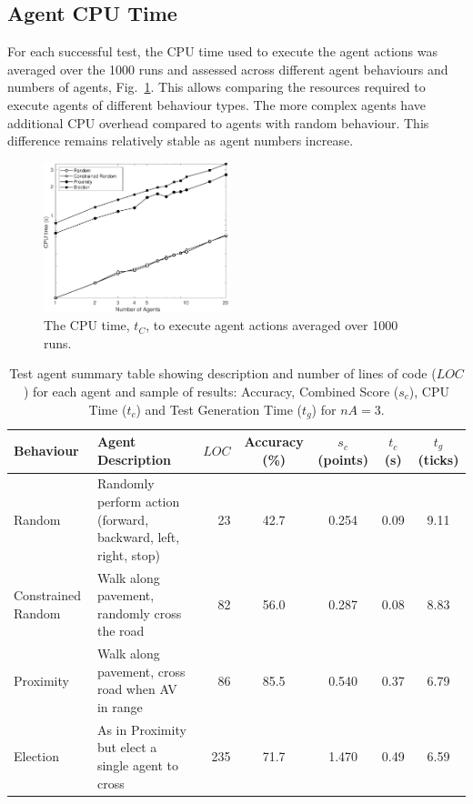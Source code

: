 \documentclass[letterpaper, 10 pt, journal, twoside]{IEEEtran}
\begin{document}
\subsection{Agent CPU Time}
For each successful test, the CPU time used to execute the agent actions was averaged over the 1000 runs and assessed across different agent behaviours and numbers of agents, Fig.~\ref{f:cputime}. This allows comparing the resources required to execute agents of different behaviour types. The more complex agents have additional CPU overhead compared to agents with random behaviour. This difference remains relatively stable as agent numbers increase.

\begin{figure}[!t]
	\centering
\includegraphics[width=0.48\textwidth]{TimeCPU.pdf}
	\caption{The CPU time, $t_{C}$, to execute agent actions averaged over 1000 runs.}
	\label{f:cputime}
\end{figure}



\begin{table}
\centering
\caption{Test agent summary table showing description and number of lines of code ($LOC$) for each agent and sample of results: Accuracy, Combined Score ($s_c$), CPU Time ($t_{c}$) and Test Generation Time ($t_{g}$) for $nA=3$.}
\label{t:ResultsTable}
\begin{tabular}{|l|p{7.1cm}|r||c|c|c|c|}
\hline
\textbf{Behaviour} & \textbf{Agent Description} & $LOC$ & Accuracy (\%) & $s_c$ (points)&  $t_{c}$ (s) & $t_{g}$ (ticks) \\
\hline
Random & Randomly perform action (forward, backward, left, right, stop) &  23& 42.7 & 0.254 & 0.09 & 9.11 \\
Constrained Random & Walk along pavement, randomly cross the road 		&  82& 56.0 & 0.287 & 0.08 & 8.83 \\
Proximity & Walk along pavement, cross road when AV in range 			&  86& 85.5 & 0.540 & 0.37 & 6.79 \\
Election & As in Proximity but elect a single agent to cross 			& 235& 71.7 & 1.470 & 0.49 & 6.59 \\
\hline 
\end{tabular}
\end{table}
\end{document}
